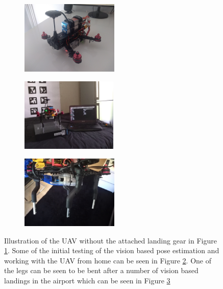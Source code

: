 \documentclass[../Head/report.tex]{subfiles}
\begin{document}
\begin{figure}[H]
    \centering
    \begin{subfigure}[t]{.30\textwidth}
        \centering
        \includegraphics[height=3.5cm]{../Figures/without_landing_gear.jpg}
        \caption{}
        \label{fig:uav_without_landing_gear}
    \end{subfigure}
     \hspace{0.2em}
    \begin{subfigure}[t]{.30\textwidth}
        \centering
        \includegraphics[height=3.5cm]{../Figures/initial_test_from_home.png}
        \caption{}
        \label{fig:uav_initial_test_from_home}
    \end{subfigure}
     \hspace{0.2em}
    \begin{subfigure}[t]{.30\textwidth}
        \centering
        \includegraphics[height=3.5cm]{../Figures/damage_landing_gear.jpg}
        \caption{}
        \label{fig:uav_damage_landing_gear}
    \end{subfigure}
    \caption{Illustration of the UAV without the attached landing gear in Figure \ref{fig:uav_without_landing_gear}. Some of the initial testing of the vision based pose estimation and working with the UAV from home can be seen in Figure \ref{fig:uav_initial_test_from_home}. One of the legs can be seen to be bent after a number of vision based landings in the airport which can be seen in Figure \ref{fig:uav_damage_landing_gear}}
    \label{fig:general_challenges}
\end{figure}
\end{document}

